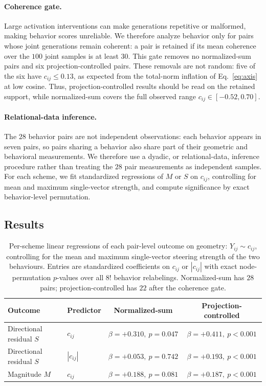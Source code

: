 \documentclass{article}
\begin{document}
\paragraph{Coherence gate.}
Large activation interventions can make generations repetitive or malformed, making behavior
scores unreliable. We therefore analyze behavior only for pairs whose joint generations remain
coherent: a pair is retained if its mean coherence over the $100$ joint samples is at least $30$.
This gate removes no normalized-sum pairs and six projection-controlled pairs. These removals are
not random: five of the six have $c_{ij}\leq 0.13$, as expected from the total-norm inflation of
Eq.~\ref{eq:axis} at low cosine. Thus, projection-controlled results should be read on the retained
support, while normalized-sum covers the full observed range $c_{ij}\in[-0.52,0.70]$.

\paragraph{Relational-data inference.}
The $28$ behavior pairs are not independent observations: each behavior appears in seven pairs, so
pairs sharing a behavior also share part of their geometric and behavioral measurements. We therefore
use a dyadic, or relational-data, inference procedure rather than treating the $28$ pair measurements
as independent samples. For each scheme, we fit standardized regressions of $M$ or $S$ on $c_{ij}$,
controlling for mean and maximum single-vector strength, and compute significance by exact
behavior-level permutation.

\subsection{Results}
\label{sec:results}

\begin{table}[t]
  \centering
  \small
  \caption{Per-scheme linear regressions of each pair-level outcome on geometry:
$Y_{ij}\sim c_{ij}$, controlling for the mean and maximum single-vector steering strength of the
two behaviours. Entries are standardized coefficients on $c_{ij}$ or $|c_{ij}|$ with exact
node-permutation $p$-values over all $8!$ behavior relabelings. Normalized-sum has $28$ pairs;
projection-controlled has $22$ after the coherence gate.}
  \label{tab:main}
  \begin{tabular}{llcc}
    \toprule
    Outcome & Predictor & Normalized-sum & Projection-controlled \\
    \midrule
    Directional residual $S$ & $c_{ij}$     & $\beta=+0.310,\ p=0.047$ & $\beta=+0.411,\ p<0.001$ \\
    Directional residual $S$ & $|c_{ij}|$   & $\beta=+0.053,\ p=0.742$ & $\beta=+0.193,\ p<0.001$ \\
    Magnitude $M$            & $c_{ij}$     & $\beta=+0.188,\ p=0.081$ & $\beta=+0.187,\ p<0.001$ \\
    \bottomrule
  \end{tabular}
\end{table}
\end{document}
